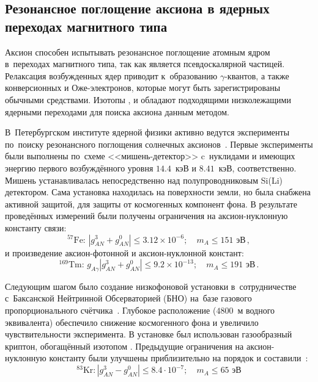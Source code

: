 \documentclass[a4paper,article,14pt]{extarticle}
\begin{document}
\subsection{Резонансное поглощение аксиона в ядерных переходах магнитного типа}
Аксион способен испытывать резонансное поглощение атомным ядром в~переходах магнитного типа, так как является псевдоскалярной частицей.
Релаксация возбужденных ядер приводит к~образованию $\gamma$-квантов, а также конверсионных и Оже-электронов, которые могут быть зарегистрированы обычными средствами.
Изотопы {\Fe}, {\Kr} и {\Tm} обладают подходящими низколежащими ядерными переходами для поиска аксиона данным методом.

В~Петербургском институте ядерной физики активно ведутся эксперименты по~поиску резонансного поглощения солнечных аксионов~\cite{Derbin2005,Derbin2007,Derbin2009,muratova2015searches,newlimits_tm}.
Первые эксперименты были выполнены по~схеме <<мишень-детектор>> c~нуклидами {\Fe} и {\Tm} имеющих энергию первого возбуждённого уровня $14.4$~кэВ и $8.41$~кэВ, соответственно.
Мишень устанавливалась непосредственно над полупроводниковым Si(Li) детектором.
Сама установка находилась на поверхности земли, но была снабжена активной защитой, для защиты от космогенных компонент фона.
В результате проведённых измерений были получены ограничения на аксион-нуклонную константу связи:
\begin{equation}
    ^{57}\text{Fe:\ }
    \left| {g_{AN}^3 + g_{AN}^0} \right| \leqslant
    3.12 \times 10^{-6};\quad m_A \leqslant 151 \text{\ эВ}\, ,
\end{equation}
и произведение аксион-фотонной и аксион-нуклонной констант:
\begin{equation}
    ^{169}\text{Tm:\ }
    g_{A\gamma} \left| {g_{AN}^3 + g_{AN}^0} \right| \leqslant
    9.2 \times {10^{ - 13}};\quad m_A \leqslant 191 \text{\ эВ}\, .
\end{equation}

Следующим шагом было создание низкофоновой установки в~сотрудничестве с~Баксанской Нейтринной Обсерваторией (БНО) на~базе газового пропорционального счётчика~\cite{83Kr}.
Глубокое расположение ($4800$~м водного эквивалента) обеспечило снижение космогенного фона и увеличило чувствительности эксперимента.
В установке был использован газообразный криптон, обогащённый изотопом {\Kr}. Предыдущие ограничения на аксион-нуклонную константу были улучшены приблизительно на порядок и составили~\cite{Derbin_2017_Kr}:
\begin{equation}
    ^{83}\text{Kr}:
    \left| {g_{AN}^3 - g_{AN}^0} \right| \leqslant
    8.4 \cdot {10^{ - 7}};\quad {m_A} \leqslant 65 \text{\ эВ}
\end{equation}
\end{document}
